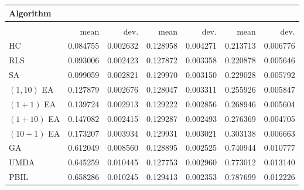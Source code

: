 \begin{tabular}{@{} l *{6}{>{{}}N{1}{2}} @{}}
\toprule
{Algorithm} &  \\
\midrule
&  &  &  \\
\midrule
& {mean} & {dev.} & {mean} & {dev.} & {mean} & {dev.} \\
\midrule
HC & 0.084755 & 0.002632 & 0.128958 & 0.004271 & 0.213713 & 0.006776 \\
RLS & 0.093006 & 0.002423 & 0.127872 & 0.003358 & 0.220878 & 0.005646 \\
SA & 0.099059 & 0.002821 & 0.129970 & 0.003150 & 0.229028 & 0.005792 \\
$(1,10)$ EA & 0.127879 & 0.002676 & 0.128047 & 0.003311 & 0.255926 & 0.005847 \\
$(1+1)$ EA & 0.139724 & 0.002913 & 0.129222 & 0.002856 & 0.268946 & 0.005604 \\
$(1+10)$ EA & 0.147082 & 0.002415 & 0.129287 & 0.002493 & 0.276369 & 0.004705 \\
$(10+1)$ EA & 0.173207 & 0.003934 & 0.129931 & 0.003021 & 0.303138 & 0.006663 \\
GA & 0.612049 & 0.008560 & 0.128895 & 0.002525 & 0.740944 & 0.010777 \\
UMDA & 0.645259 & 0.010445 & 0.127753 & 0.002960 & 0.773012 & 0.013140 \\
PBIL & 0.658286 & 0.010245 & 0.129413 & 0.002353 & 0.787699 & 0.012226 \\
\bottomrule
\end{tabular}
